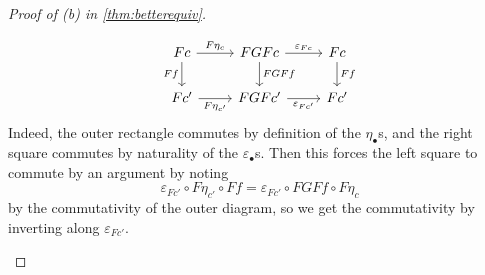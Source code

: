 \documentclass[../notes.tex]{subfiles}
\begin{document}
\begin{proof}[Proof of (b) in \autoref{thm:betterequiv}]
\begin{itemize}
		\[\begin{tikzcd}
			Fc & FGFc & Fc \\
			{Fc'} & {FGFc'} & {Fc'}
			\arrow["{F\eta_c}", from=1-1, to=1-2]
			\arrow["Ff"', from=1-1, to=2-1]
			\arrow["{F\eta_{c'}}"', from=2-1, to=2-2]
			\arrow["FGFf", from=1-2, to=2-2]
			\arrow["Ff", from=1-3, to=2-3]
			\arrow["{\varepsilon_{Fc}}", from=1-2, to=1-3]
			\arrow["{\varepsilon_{Fc'}}"', from=2-2, to=2-3]
		\end{tikzcd}\]
		Indeed, the outer rectangle commutes by definition of the $\eta_\bullet$s, and the right square commutes by naturality of the $\varepsilon_\bullet$s. Then this forces the left square to commute by an argument by noting
		\[\varepsilon_{Fc'}\circ F\eta_{c'}\circ Ff=\varepsilon_{Fc'}\circ FGFf\circ F\eta_c\]
		by the commutativity of the outer diagram, so we get the commutativity by inverting along $\varepsilon_{Fc'}$.
		\qedhere
	\end{itemize}
\end{proof}
\end{document}
